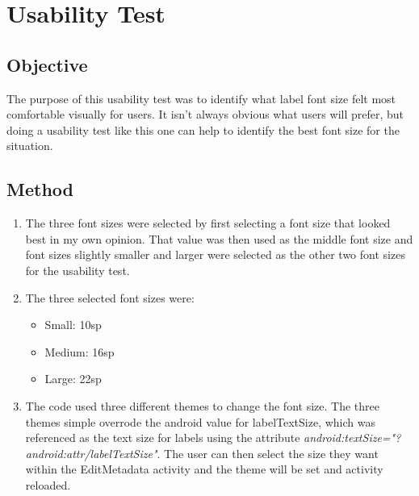 \documentclass[11pt,english,numbers=endperiod,parskip=half]{scrartcl}
\begin{document}
\section{Usability Test}
\subsection{Objective}
The purpose of this usability test was to identify what label font size felt most comfortable visually for users. It isn't always obvious what users will prefer, but doing a usability test like this one can help to identify the best font size for the situation.
\subsection{Method}
\begin{enumerate}
	\item{The three font sizes were selected by first selecting a font size that looked best in my own opinion. That value was then used as the middle font size and font sizes slightly smaller and larger were selected as the other two font sizes for the usability test.}
	\item{The three selected font sizes were:
		\begin{itemize}
			\item{Small: 10sp}
			\item{Medium: 16sp}
			\item{Large: 22sp}
		\end{itemize}
	}
	\item{The code used three different themes to change the font size. The three themes simple overrode the android value for labelTextSize, which was referenced as the text size for labels using the attribute \textit{android:textSize="?android:attr/labelTextSize"}. The user can then select the size they want within the EditMetadata activity and the theme will be set and activity reloaded.}
\end{enumerate}
\end{document}
